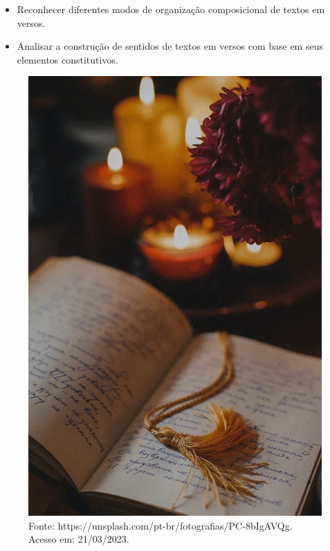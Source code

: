 
\begin{itemize}
\item Reconhecer diferentes modos de organização composicional de textos em
versos.

\item Analisar a construção de sentidos de textos em versos com base em seus
elementos constitutivos.
\end{itemize}

\begin{figure}[htpb!]
\includegraphics[width=.5\textwidth]{./imgs/img16.jpg}
\caption{Fonte: https://unsplash.com/pt-br/fotografias/PC-8bIgAVQg. Acesso em: 21/03/2023.}
\end{figure}

